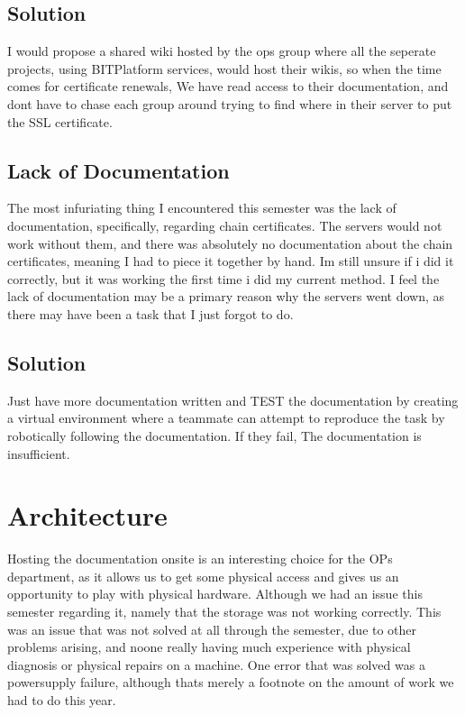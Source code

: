 \documentclass{article}
\begin{document}
\subsection*{Solution}
I would propose a shared wiki hosted by the ops group where all the seperate projects, using BITPlatform services, would host their wikis, so when the time comes for certificate renewals, We have read access to their documentation, and dont have to chase each group around trying to find where in their server to put the SSL certificate.

\subsection{Lack of Documentation}
The most infuriating thing I encountered this semester was the lack of documentation, specifically, regarding chain certificates.
The servers would not work without them, and there was absolutely no documentation about the chain certificates, meaning I had to piece it together by hand.
Im still unsure if i did it correctly, but it was working the first time i did my current method. I feel the lack of documentation may be a primary reason
why the servers went down, as there may have been a task that I just forgot to do.

\subsection*{Solution}
Just have more documentation written and TEST the documentation by creating a virtual environment where a teammate can attempt to reproduce the task by robotically
following the documentation. If they fail, The documentation is insufficient. 

\section{Architecture}
Hosting the documentation onsite is an interesting choice for the OPs department, as it allows us to get some physical access and gives us an opportunity to play
with physical hardware. Although we had an issue this semester regarding it, namely that the storage was not working correctly. 
This was an issue that was not solved at all through the semester, due to other problems arising, and noone really having much experience with physical diagnosis 
or physical repairs on a machine. One error that was solved was a powersupply failure, although thats merely a footnote on the amount of work we had to do this year.
\end{document}
